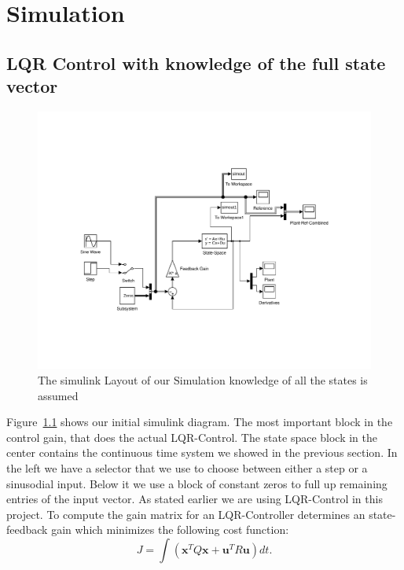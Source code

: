 \documentclass[ twoside,openright,titlepage,numbers=noenddot,headinclude,%
                footinclude=true,cleardoublepage=empty,abstractoff, %
                BCOR=5mm,paper=a4,fontsize=11pt,%
                ngerman,american,%
                ]{scrreprt}
\begin{document}
\chapter{Simulation}
\section{LQR Control with knowledge of the full state vector}
\begin{figure}
\includegraphics[scale=0.5]{images/simModelFullState.pdf}
\caption{The simulink Layout of our Simulation knowledge of all the states is assumed}
\label{fig:allStates}
\end{figure}
Figure~\ref{fig:allStates} shows our initial simulink diagram. The most important block in the control gain, that does the actual LQR-Control. The state space block in the center contains the continuous time system we showed in the previous section. In the left we have a selector that we use to choose between either a step or a sinusodial input. Below it we use a block of constant zeros to full up remaining entries of the input vector. 
As stated earlier we are using LQR-Control in this project. To compute the gain matrix for an LQR-Controller determines an state-feedback gain which minimizes the following cost function:
\begin{equation}
J = \int(\mathbf{x}^T Q \mathbf{x} + \mathbf{u}^T R \mathbf{u})dt.
\end{equation}
\end{document}
